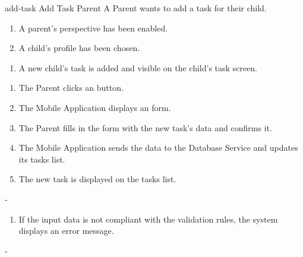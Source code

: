 {add-task}
{Add Task}
{Parent}
{A Parent wants to add a task for their child.}
{\begin{enumerate} %
    \item A parent's perspective has been enabled.
    \item A child's profile has been chosen.
\end{enumerate}}
{\begin{enumerate} %
   \item A new child's task is added and visible on the child's task screen.
\end{enumerate}}
{\begin{enumerate} %
   \item The Parent clicks an  button.
   \item The Mobile Application displays an  form.
   \item The Parent fills in the form with the new task's data and confirms it.
   \item The Mobile Application sends the data to the Database Service and updates its tasks list.
   \item The new task is displayed on the tasks list.
\end{enumerate}}
{-}%
{\begin{enumerate} %
[label=3.\alph*.]
    \item If the input data is not compliant with the validation rules, the system displays an error message.
\end{enumerate}}
{-} %



